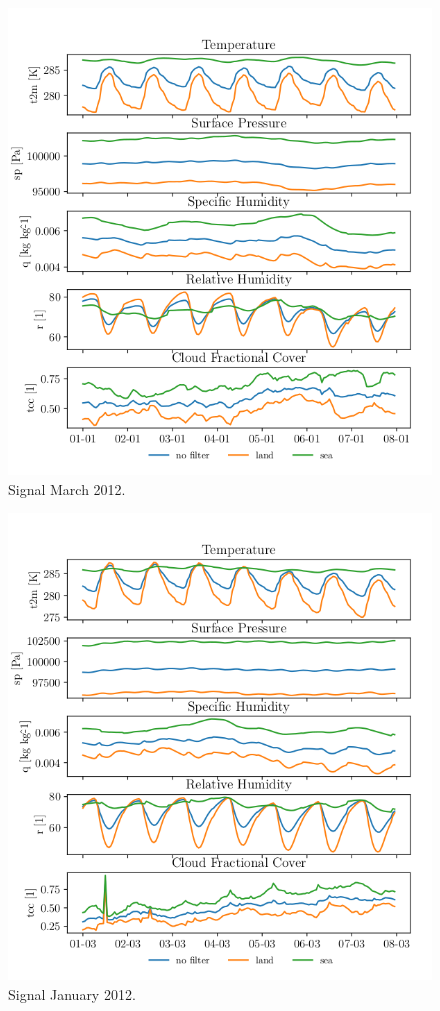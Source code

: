 \begin{figure}[ht]
    \centering
    \includegraphics{python_figs/spatially_averaged_one_week_from_2012-01-01.png}
    \caption{Signal March 2012.}
    \label{fig:jan12}
\end{figure}
\begin{figure}[ht]
    \centering
    \includegraphics{python_figs/spatially_averaged_one_week_from_2012-03-01.png}
    \caption{Signal January 2012.}
    \label{fig:jan12}
\end{figure}

